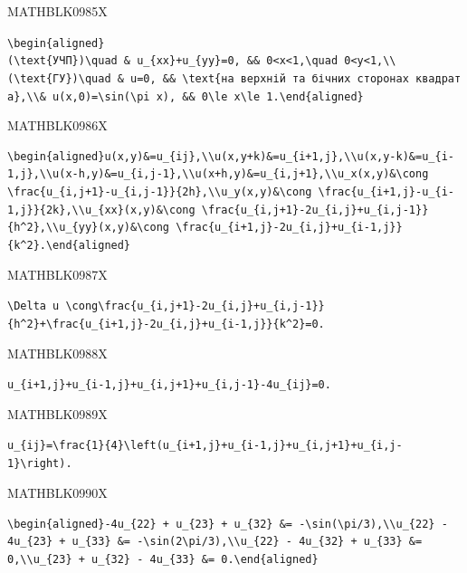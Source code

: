 \documentclass[
  ukrainian,
]{article}
\begin{document}
MATHBLK0985X

\texttt{\textbackslash{}begin\{aligned\}(\textbackslash{}text\{УЧП\})\textbackslash{}quad\ \&\ u\_\{xx\}+u\_\{yy\}=0,\ \&\&\ 0\textless{}x\textless{}1,\textbackslash{}quad\ 0\textless{}y\textless{}1,\textbackslash{}\textbackslash{}(\textbackslash{}text\{ГУ\})\textbackslash{}quad\ \&\ u=0,\ \&\&\ \textbackslash{}text\{на\ верхній\ та\ бічних\ сторонах\ квадрата\},\textbackslash{}\textbackslash{}\&\ u(x,0)=\textbackslash{}sin(\textbackslash{}pi\ x),\ \&\&\ 0\textbackslash{}le\ x\textbackslash{}le\ 1.\textbackslash{}end\{aligned\}}

MATHBLK0986X

\begin{verbatim}
\begin{aligned}u(x,y)&=u_{ij},\\u(x,y+k)&=u_{i+1,j},\\u(x,y-k)&=u_{i-1,j},\\u(x-h,y)&=u_{i,j-1},\\u(x+h,y)&=u_{i,j+1},\\u_x(x,y)&\cong \frac{u_{i,j+1}-u_{i,j-1}}{2h},\\u_y(x,y)&\cong \frac{u_{i+1,j}-u_{i-1,j}}{2k},\\u_{xx}(x,y)&\cong \frac{u_{i,j+1}-2u_{i,j}+u_{i,j-1}}{h^2},\\u_{yy}(x,y)&\cong \frac{u_{i+1,j}-2u_{i,j}+u_{i-1,j}}{k^2}.\end{aligned}
\end{verbatim}

MATHBLK0987X

\begin{verbatim}
\Delta u \cong\frac{u_{i,j+1}-2u_{i,j}+u_{i,j-1}}{h^2}+\frac{u_{i+1,j}-2u_{i,j}+u_{i-1,j}}{k^2}=0.
\end{verbatim}

MATHBLK0988X

\begin{verbatim}
u_{i+1,j}+u_{i-1,j}+u_{i,j+1}+u_{i,j-1}-4u_{ij}=0.
\end{verbatim}

MATHBLK0989X

\begin{verbatim}
u_{ij}=\frac{1}{4}\left(u_{i+1,j}+u_{i-1,j}+u_{i,j+1}+u_{i,j-1}\right).
\end{verbatim}

MATHBLK0990X

\begin{verbatim}
\begin{aligned}-4u_{22} + u_{23} + u_{32} &= -\sin(\pi/3),\\u_{22} - 4u_{23} + u_{33} &= -\sin(2\pi/3),\\u_{22} - 4u_{32} + u_{33} &= 0,\\u_{23} + u_{32} - 4u_{33} &= 0.\end{aligned}
\end{verbatim}
\end{document}
